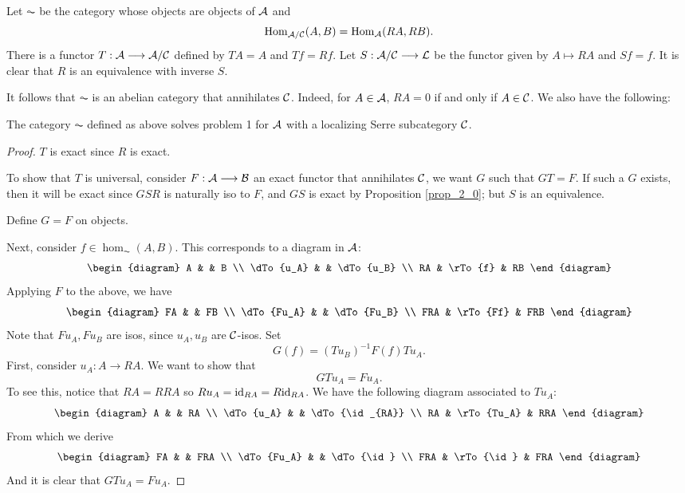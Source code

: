 Let $\AC$ be the category whose objects are objects of $\mathcal{A}$
and 
\[
\mathrm{Hom}_{\mathcal{A}/\mathcal{C}}(A, B) = \mathrm{Hom}_{\mathcal{A}}(RA, RB).
\]
There is a functor $T: \mathcal{A} \longrightarrow \mathcal{A}/\mathcal{C}$ defined by $TA = A$ and 
$Tf = Rf$. Let $S : \mathcal{A}/\mathcal{C} \longrightarrow \mathcal{L}$ be the functor given by $A 
\mapsto RA$ and $Sf = f$. It is clear that $R$ is an equivalence 
with inverse $S$.

It follows that $\AC$ is an abelian category that annihilates
$\mathcal{C}$. Indeed, for $A \in \mathcal{A}$, $RA = 0$ if and only if
$A \in \mathcal{C}$. We also have the following:

\begin{thm}
The category $\AC$ defined as above solves problem 1 for 
$\mathcal{A}$ with a localizing Serre subcategory $\mathcal{C}$.
\end{thm}

\begin{proof}
$T$ is exact since $R$ is exact.

To show that $T$ is universal, consider $F : \mathcal{A} \longrightarrow \mathcal{B}$
an exact functor that annihilates $\mathcal{C}$, we want $G$ such that
$GT = F$. If such a $G$ exists, then it will be exact since $GSR$
is naturally iso to $F$, and $GS$ is exact by Proposition 
\ref{prop_2_0}; but $S$ is an equivalence.

Define $G = F$ on objects.

Next, consider $f \in \hom_{\AC}(A, B)$. This corresponds to a 
diagram in $\mathcal{A}$:
\begin{equation}\label{2_star}
\begin{diagram}
A         &         & B         \\
\dTo{u_A} &         & \dTo{u_B} \\
RA        & \rTo{f} & RB
\end{diagram}
\end{equation}
Applying $F$ to the above, we have
\[
\begin{diagram}
FA         &          & FB         \\
\dTo{Fu_A} &          & \dTo{Fu_B} \\
FRA        & \rTo{Ff} & FRB
\end{diagram}
\]
Note that $Fu_A, Fu_B$ are isos, since $u_A, u_B$ are 
$\mathcal{C}$-isos. Set 
\[
G(f) = (Tu_B)^{-1}F(f)Tu_A.
\]
First, consider
$u_A : A \to RA$. We want to show that 
\[
GTu_A = Fu_A.
\]
To see this, notice that $RA = RRA$ so $Ru_A = \mathrm{id}_{RA} = 
R\mathrm{id}_{RA}$. We have the following diagram associated to
$Tu_A$:
\[
\begin{diagram}
A         &            & RA             \\
\dTo{u_A} &            & \dTo{\id_{RA}} \\
RA        & \rTo{Tu_A} & RRA
\end{diagram}
\]
From which we derive
\[
\begin{diagram}
FA         &           & FRA       \\
\dTo{Fu_A} &           & \dTo{\id} \\
FRA        & \rTo{\id} & FRA
\end{diagram}
\]
And it is clear that $GTu_A = Fu_A$.


\end{proof}
